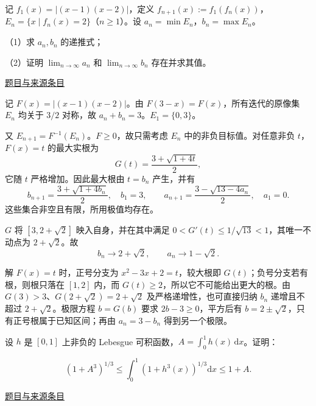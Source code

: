 \documentclass[12pt,fontset=fandol]{ctexart}
\begin{document}
\begin{example}\label{ex:fin17-low:7}\label{pr:fin17-low:7}

记 $f_1(x)=|(x-1)(x-2)|$，定义 $f_{n+1}(x):=f_1(f_n(x))$，$E_n=\{x\mid f_n(x)=2\}$（$n\ge1$）。设 $a_n=\min E_n$，$b_n=\max E_n$。

（1）求 $a_n,b_n$ 的递推式；

（2）证明 $\lim_{n\to\infty}a_n$ 和 $\lim_{n\to\infty}b_n$ 存在并求其值。

\par\href{https://github.com/lzxcr/cmc-mathematics/blob/64916fa1fdbc3e444a652eca204d5669058ee321/src/problems/finals/17/09.md}{题目与来源条目}

\end{example}

\begin{solve}\label{ans:fin17-low:7}

记 $F(x)=|(x-1)(x-2)|$。由 $F(3-x)=F(x)$，所有迭代的原像集 $E_n$ 均关于 $3/2$ 对称，故 $a_n+b_n=3$。$E_1=\{0,3\}$。

又 $E_{n+1}=F^{-1}(E_n)$。$F\ge0$，故只需考虑 $E_n$ 中的非负目标值。对任意非负 $t$，$F(x)=t$ 的最大实根为
\[
G(t)=\frac{3+\sqrt{1+4t}}2,
\]
它随 $t$ 严格增加。因此最大根由 $t=b_n$ 产生，并有
\[
\boxed{b_{n+1}=\frac{3+\sqrt{1+4b_n}}2,\quad b_1=3},
\qquad
\boxed{a_{n+1}=\frac{3-\sqrt{13-4a_n}}2,\quad a_1=0}.
\]
这些集合非空且有限，所用极值均存在。

$G$ 将 $[3,2+\sqrt2]$ 映入自身，并在其中满足 $0<G'(t)\le1/\sqrt{13}<1$，其唯一不动点为 $2+\sqrt2$。故
\[
\boxed{b_n\to2+\sqrt2,\qquad a_n\to1-\sqrt2}.
\]

解 $F(x)=t$ 时，正号分支为 $x^2-3x+2=t$，较大根即 $G(t)$；负号分支若有根，则根只落在 $[1,2]$ 内，而 $G(t)\ge2$，所以它不可能给出更大的根。由 $G(3)>3$、$G(2+\sqrt2)=2+\sqrt2$ 及严格递增性，也可直接归纳 $b_n$ 递增且不超过 $2+\sqrt2$。极限方程 $b=G(b)$ 要求 $2b-3\ge0$，平方后有 $b=2\pm\sqrt2$，只有正号根属于已知区间；再由 $a_n=3-b_n$ 得到另一个极限。

\end{solve}

\begin{example}\label{ex:fin17-high:8}\label{pr:fin17-high:8}

设 $h$ 是 $[0,1]$ 上非负的 Lebesgue 可积函数，$A=\int_0^1h(x)\,\mathrm{d}x$。证明：

\[
\left(1+A^3\right)^{1/3}\le\int_0^1\left(1+h^3(x)\right)^{1/3}\mathrm{d}x\le1+A .
\]

\par\href{https://github.com/lzxcr/cmc-mathematics/blob/64916fa1fdbc3e444a652eca204d5669058ee321/src/problems/finals/17/10.md}{题目与来源条目}

\end{example}
\end{document}
